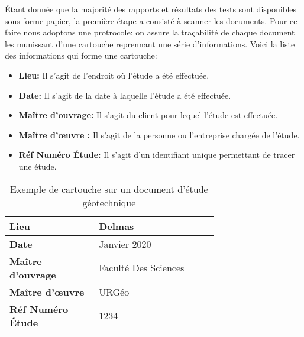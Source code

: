 

                \par
                Étant donnée que la majorité des rapports et résultats des tests sont 
                disponibles sous forme papier, la première étape a consisté à scanner les documents.
                Pour ce faire nous adoptons une protrocole: on assure la traçabilité de chaque 
                document les munissant d'une cartouche reprennant une série d'informations.
                Voici la liste des informations qui forme une cartouche:
                \begin{itemize}
                        \item \textbf{Lieu: }
                        Il s'agit de l'endroit où l'étude a été effectuée.
                        \item \textbf{Date: }
                        Il s'agit de la date à laquelle l'étude a été effectuée.
                        \item \textbf{Maître d'ouvrage: }
                        Il s'agit du client pour lequel l'étude est effectuée.
                        \item \textbf{Maître d'œuvre : }
                        Il s'agit de la personne ou l'entreprise chargée de l'étude.
                        \item \textbf{Réf Numéro Étude: }
                        Il s'agit d'un identifiant unique permettant de tracer une étude.
                \end{itemize}
                
\par    
\begin{table}
        \centering
        \begin{tabular}{|p{0.30\linewidth}|p{0.40\linewidth}|}
                \hline
                \textbf{Lieu} & Delmas \\
                \hline
                \textbf{Date} & Janvier 2020 \\
                \hline
                \textbf{Maître d'ouvrage} & Faculté Des Sciences \\
                \hline
                \textbf{Maître d'œuvre} & URGéo \\
                \hline
                \textbf{Réf Numéro Étude} & 1234 \\
                \hline
        \end{tabular}
        \caption{Exemple de cartouche sur un document d'étude géotechnique} \label{tab:example_cartouche}
\end{table}
\par
